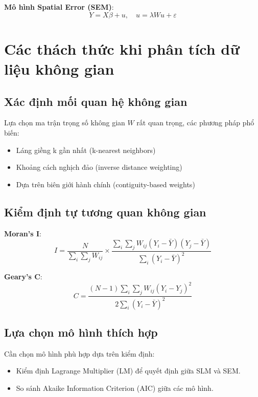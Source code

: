 \textbf{Mô hình Spatial Error (SEM)}:
\begin{equation}
    Y = X \beta + u, \quad u = \lambda W u + \varepsilon
\end{equation}

\section{Các thách thức khi phân tích dữ liệu không gian}
\subsection{Xác định mối quan hệ không gian}
Lựa chọn ma trận trọng số không gian $W$ rất quan trọng, các phương pháp phổ biến:
\begin{itemize}
    \item Láng giềng k gần nhất (k-nearest neighbors)
    \item Khoảng cách nghịch đảo (inverse distance weighting)
    \item Dựa trên biên giới hành chính (contiguity-based weights)
\end{itemize}

\subsection{Kiểm định tự tương quan không gian}
\textbf{Moran’s I}:
\begin{equation}
    I = \frac{N}{\sum_i \sum_j W_{ij}} \times \frac{\sum_i \sum_j W_{ij} (Y_i - \bar{Y}) (Y_j - \bar{Y})}{\sum_i (Y_i - \bar{Y})^2}
\end{equation}

\textbf{Geary’s C}:
\begin{equation}
    C = \frac{(N-1) \sum_i \sum_j W_{ij} (Y_i - Y_j)^2}{2 \sum_i (Y_i - \bar{Y})^2}
\end{equation}

\subsection{Lựa chọn mô hình thích hợp}
Cần chọn mô hình phù hợp dựa trên kiểm định:
\begin{itemize}
    \item Kiểm định Lagrange Multiplier (LM) để quyết định giữa SLM và SEM.
    \item So sánh Akaike Information Criterion (AIC) giữa các mô hình.
\end{itemize}

